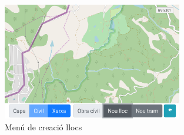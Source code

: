 \documentclass[a4paper]{article}
\begin{document}
	\begin{figure}[H]
		\centering
		\includegraphics[width=0.7\textwidth]{images/newsite_menu.png}
		\caption{Menú de creació llocs}
		\label{fig:newsite-menu}
	\end{figure}
	
\end{document}
